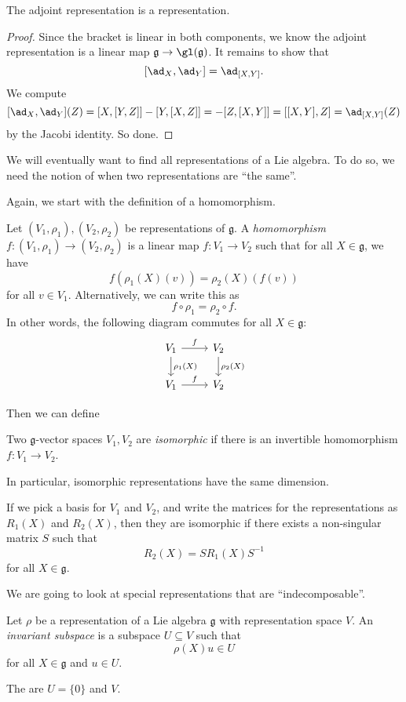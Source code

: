 \documentclass[a4paper]{article}
\begin{document}
\begin{prop}
  The adjoint representation is a representation.
\end{prop}

\begin{proof}
  Since the bracket is linear in both components, we know the adjoint representation is a linear map $\mathfrak{g} \to \gl(\mathfrak{g})$. It remains to show that
  \[
    [\ad_X, \ad_Y] = \ad_{[X, Y]}.
  \]
  We compute
  \[
    [\ad_X, \ad_Y](Z) = [X, [Y, Z]] - [Y, [X, Z]] = -[Z, [X, Y]] = [[X, Y], Z] = \ad_{[X, Y]}(Z)
  \]
  by the Jacobi identity. So done.
\end{proof}

We will eventually want to find all representations of a Lie algebra. To do so, we need the notion of when two representations are ``the same''.

Again, we start with the definition of a homomorphism.
\begin{defi}
  Let $(V_1, \rho_1), (V_2, \rho_2)$ be representations of $\mathfrak{g}$. A \emph{homomorphism} $f: (V_1, \rho_1) \to (V_2, \rho_2)$ is a linear map $f: V_1 \to V_2$ such that for all $X \in \mathfrak{g}$, we have
  \[
    f(\rho_1(X)(v)) = \rho_2(X)(f(v))
  \]
  for all $v \in V_1$. Alternatively, we can write this as
  \[
    f \circ \rho_1 = \rho_2 \circ f.
  \]
  In other words, the following diagram commutes for all $X \in \mathfrak{g}$:
  \[
    \begin{tikzcd}
      V_1 \ar[r, "f"] \ar[d, "\rho_1(X)"] & V_2 \ar[d, "\rho_2(X)"]\\
      V_1 \ar[r, "f"] & V_2
    \end{tikzcd}
  \]
\end{defi}

Then we can define
\begin{defi}
  Two $\mathfrak{g}$-vector spaces $V_1, V_2$ are \emph{isomorphic} if there is an invertible homomorphism $f: V_1 \to V_2$.
\end{defi}
In particular, isomorphic representations have the same dimension.

If we pick a basis for $V_1$ and $V_2$, and write the matrices for the representations as $R_1(X)$ and $R_2(X)$, then they are isomorphic if there exists a non-singular matrix $S$ such that
\[
  R_2(X) = SR_1(X) S^{-1}
\]
for all $X \in \mathfrak{g}$.

We are going to look at special representations that are ``indecomposable''.
\begin{defi}
  Let $\rho$ be a representation of a Lie algebra $\mathfrak{g}$ with representation space $V$. An \emph{invariant subspace} is a subspace $U \subseteq V$ such that
  \[
    \rho(X) u \in U
  \]
  for all $X \in \mathfrak{g}$ and $u \in U$.

  The  are $U = \{0\}$ and $V$.
\end{defi}
\end{document}
